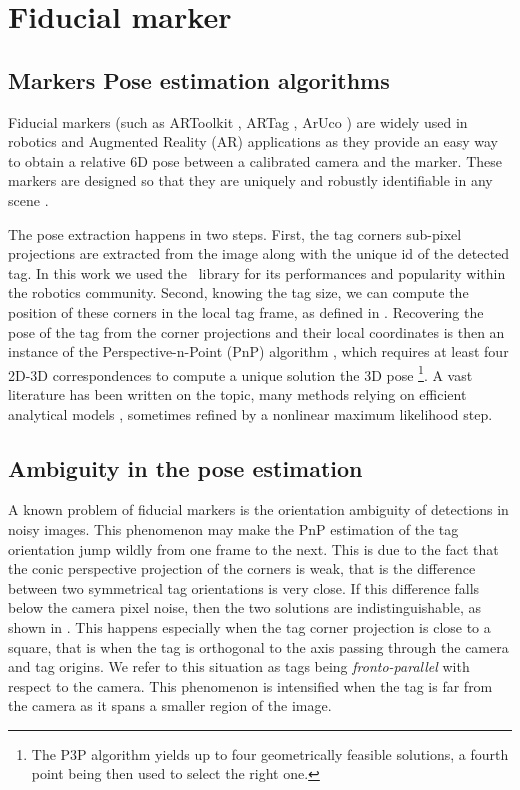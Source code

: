 %
%
\section{Fiducial marker}
\subsection{Markers Pose estimation algorithms}

Fiducial markers (such as ARToolkit \cite{kato1999marker}, ARTag \cite{fiala2005artag}, ArUco \cite{garrido2014automatic}) are widely used in robotics 
and Augmented Reality (AR) applications as they provide an easy way to obtain a relative 6D pose 
between a calibrated camera and the marker. These markers are designed so that they are uniquely and robustly identifiable in any scene 
\cite{wang2016iros,romero2018speeded}. 

The pose extraction happens in two steps. First, the tag corners sub-pixel projections are extracted from the image along with the unique id of the detected tag. 
In this work we used the \apriltag\ library \cite{wang2016iros} for its performances and popularity within the robotics community. Second, knowing the tag size, 
we can compute the position of these corners in the local tag frame, as defined in . Recovering the pose of the tag from the 
corner projections and their local coordinates is then an instance 
of the Perspective-n-Point (PnP) algorithm \cite{gao2003complete}, which requires at least four 2D-3D correspondences to compute a unique solution the 3D pose 
\footnote{The P3P algorithm yields up to four geometrically feasible solutions, a fourth point being then used to select the right one.}. 
A vast literature has been written on the topic, many methods relying on efficient analytical models
\cite{gao2003complete, lepetit2009epnp, collins2014infinitesimal, terzakis2020consistently}, sometimes refined by a nonlinear maximum likelihood step.




\subsection{Ambiguity in the pose estimation}
\label{sec:tag_ambiguity}

A known problem of fiducial markers is the orientation ambiguity of detections in noisy images. This phenomenon may make the PnP estimation of the 
tag orientation jump wildly from one frame to the next. This is due to the fact that the conic perspective projection of the corners is weak, 
that is the difference between two symmetrical tag orientations is very close. If this difference falls below the camera pixel noise, 
then the two solutions are indistinguishable, as shown in . This happens especially when the tag corner projection is 
close to a square, that is when the tag is orthogonal to the axis passing through the camera and tag origins. 
We refer to this situation as tags being \textit{fronto-parallel} with respect to the camera.
This phenomenon is intensified when the tag is far from the camera as it spans a smaller region of the image. 

